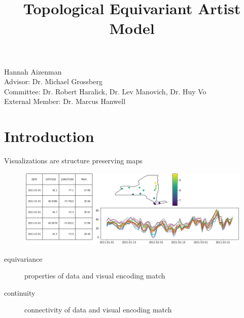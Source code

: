 \documentclass[xcolor={dvipsnames}, handout]{beamer}
\begin{document}
\title{Topological Equivariant Artist Model}

\begin{frame}
	\titlepage
    Hannah Aizenman\\
    Advisor: Dr. Michael Grossberg \\
    Committee: Dr. Robert Haralick, Dr. Lev Manovich, Dr. Huy Vo\\
    External Member: Dr. Marcus Hanwell
\end{frame}

\section{Introduction}

\begin{frame}{Visualizations are structure preserving maps}
    \begin{figure}
        \includegraphics[width=\textwidth]{figures/intro/viz_same.png}
    \end{figure}
    \pause 
    \begin{description}
        \item[equivariance] properties of data and visual encoding match
    \pause 
        \item[continuity] connectivity of data and visual encoding match
    \end{description}
\end{frame}
\end{document}
